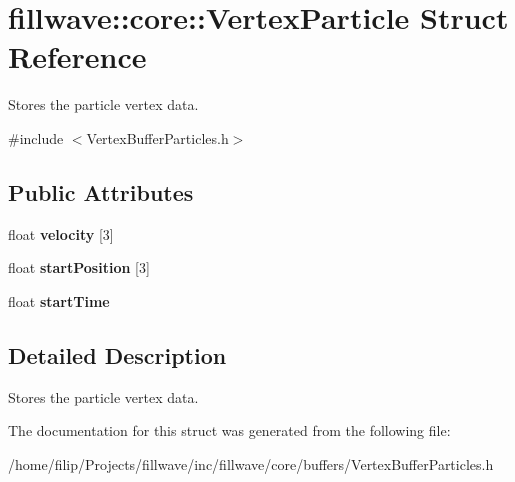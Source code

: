 \hypertarget{structfillwave_1_1core_1_1VertexParticle}{}\section{fillwave\+:\+:core\+:\+:Vertex\+Particle Struct Reference}
\label{structfillwave_1_1core_1_1VertexParticle}


Stores the particle vertex data.  




{\ttfamily \#include $<$Vertex\+Buffer\+Particles.\+h$>$}

\subsection*{Public Attributes}
\begin{DoxyCompactItemize}
\item 
\hypertarget{structfillwave_1_1core_1_1VertexParticle_a31124aa4fb61cab42e5d8cf48312874a}{}float {\bfseries velocity} \mbox{[}3\mbox{]}\label{structfillwave_1_1core_1_1VertexParticle_a31124aa4fb61cab42e5d8cf48312874a}

\item 
\hypertarget{structfillwave_1_1core_1_1VertexParticle_add1ea7d1ecbb02a1a7c98b524fc6aa46}{}float {\bfseries start\+Position} \mbox{[}3\mbox{]}\label{structfillwave_1_1core_1_1VertexParticle_add1ea7d1ecbb02a1a7c98b524fc6aa46}

\item 
\hypertarget{structfillwave_1_1core_1_1VertexParticle_aa0da2f61f0bac423d78f827887ef4cd7}{}float {\bfseries start\+Time}\label{structfillwave_1_1core_1_1VertexParticle_aa0da2f61f0bac423d78f827887ef4cd7}

\end{DoxyCompactItemize}


\subsection{Detailed Description}
Stores the particle vertex data. 

The documentation for this struct was generated from the following file\+:\begin{DoxyCompactItemize}
\item 
/home/filip/\+Projects/fillwave/inc/fillwave/core/buffers/Vertex\+Buffer\+Particles.\+h\end{DoxyCompactItemize}
